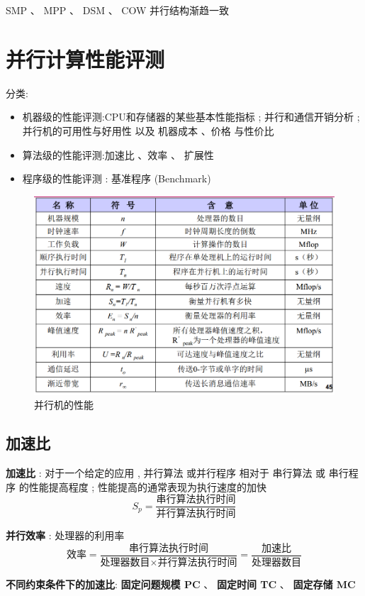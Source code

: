 \documentclass[UTF8,a4paper]{ctexart}
\begin{document}
  SMP 、 MPP 、 DSM 、 COW 并行结构渐趋一致

  \section{并行计算性能评测}
  分类:
  \begin{itemize}
    \item 机器级的性能评测:CPU和存储器的某些基本性能指标 ; 并行和通信开销分析 ; 并行机的可用性与好用性 以及 机器成本 、价格 与性价比
    \item 算法级的性能评测:加速比 、效率 、 扩展性
    \item 程序级的性能评测 : 基准程序 (Benchmark)
  \end{itemize}

  \begin{figure}[H]
    \centering
    \includegraphics[scale = 0.3]{assets/ParallelComputing_d4d8f.png}
    \caption{并行机的性能}
  \end{figure}

  \subsection{加速比}
  \textbf{加速比} : 对于一个给定的应用 , 并行算法 或并行程序 相对于 串行算法 或 串行程序 的性能提高程度 ; 性能提高的通常表现为执行速度的加快
  \[S_p = \frac{\text{串行算法执行时间}}{\text{并行算法执行时间}}\]

  \textbf{并行效率} : 处理器的利用率
  \[\text{效率} =  \frac{\text{串行算法执行时间}}{\text{处理器数目}\times\text{并行算法执行时间}} = \frac{\text{加速比}}{\text{处理器数目}}\]

  \textbf{不同约束条件下的加速比}: \textbf{固定问题规模 PC} 、 \textbf{固定时间 TC} 、 \textbf{固定存储 MC}
\end{document}
